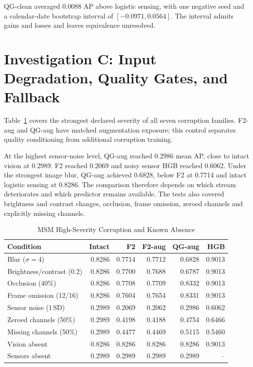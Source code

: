 QG-clean averaged $0.0088$ AP above logistic sensing, with one negative seed and a
calendar-date bootstrap interval of $[-0.0971,0.0564]$. The interval admits gains and
losses and leaves equivalence unresolved.

\section{Investigation C: Input Degradation, Quality Gates, and Fallback}
Table~\ref{tab:msm-robustness} covers the strongest declared severity of all seven
corruption families. F2-aug and QG-aug have matched augmentation exposure; this control
separates quality conditioning from additional corruption training.

At the highest sensor-noise level, QG-aug reached 0.2986 mean AP, close to intact
vision at 0.2989. F2 reached 0.2069 and noisy sensor HGB reached 0.6062. Under the
strongest image blur, QG-aug achieved 0.6828, below F2 at 0.7714 and intact logistic
sensing at 0.8286. The comparison therefore depends on which stream deteriorates and
which predictor remains available. The tests also covered brightness and contrast
changes, occlusion, frame omission, zeroed channels and explicitly missing channels.


\begin{table}[htbp]
\caption{MSM High-Severity Corruption and Known Absence}\label{tab:msm-robustness}
\centering\small\setlength{\tabcolsep}{4pt}
\begin{tabular}{lrrrrr}\toprule
Condition & Intact & F2 & F2-aug & QG-aug & HGB\\\midrule
Blur ($\sigma=4$) & 0.8286 & 0.7714 & 0.7712 & 0.6828 & 0.9013\\
Brightness/contrast (0.2) & 0.8286 & 0.7700 & 0.7688 & 0.6787 & 0.9013\\
Occlusion (40\%) & 0.8286 & 0.7708 & 0.7709 & 0.8332 & 0.9013\\
Frame omission (12/16) & 0.8286 & 0.7604 & 0.7654 & 0.8331 & 0.9013\\
Sensor noise ($1\,\mathrm{SD}$) & 0.2989 & 0.2069 & 0.2062 & 0.2986 & 0.6062\\
Zeroed channels (50\%) & 0.2989 & 0.4198 & 0.4188 & 0.4754 & 0.6466\\
Missing channels (50\%) & 0.2989 & 0.4477 & 0.4469 & 0.5115 & 0.5460\\
Vision absent & 0.8286 & 0.8286 & 0.8286 & 0.8286 & 0.9013\\
Sensors absent & 0.2989 & 0.2989 & 0.2989 & 0.2989 & --\\
\bottomrule\end{tabular}
\end{table}

